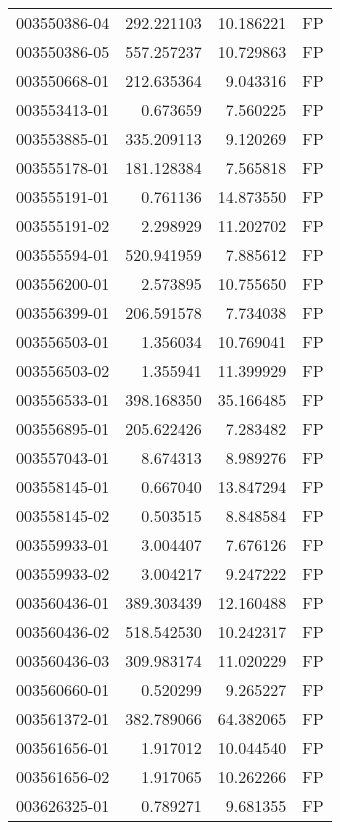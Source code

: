 \begin{tabular}{lrrl}
003550386-04 &  292.221103 &      10.186221 &   FP \\
003550386-05 &  557.257237 &      10.729863 &   FP \\
003550668-01 &  212.635364 &       9.043316 &   FP \\
003553413-01 &    0.673659 &       7.560225 &   FP \\
003553885-01 &  335.209113 &       9.120269 &   FP \\
003555178-01 &  181.128384 &       7.565818 &   FP \\
003555191-01 &    0.761136 &      14.873550 &   FP \\
003555191-02 &    2.298929 &      11.202702 &   FP \\
003555594-01 &  520.941959 &       7.885612 &   FP \\
003556200-01 &    2.573895 &      10.755650 &   FP \\
003556399-01 &  206.591578 &       7.734038 &   FP \\
003556503-01 &    1.356034 &      10.769041 &   FP \\
003556503-02 &    1.355941 &      11.399929 &   FP \\
003556533-01 &  398.168350 &      35.166485 &   FP \\
003556895-01 &  205.622426 &       7.283482 &   FP \\
003557043-01 &    8.674313 &       8.989276 &   FP \\
003558145-01 &    0.667040 &      13.847294 &   FP \\
003558145-02 &    0.503515 &       8.848584 &   FP \\
003559933-01 &    3.004407 &       7.676126 &   FP \\
003559933-02 &    3.004217 &       9.247222 &   FP \\
003560436-01 &  389.303439 &      12.160488 &   FP \\
003560436-02 &  518.542530 &      10.242317 &   FP \\
003560436-03 &  309.983174 &      11.020229 &   FP \\
003560660-01 &    0.520299 &       9.265227 &   FP \\
003561372-01 &  382.789066 &      64.382065 &   FP \\
003561656-01 &    1.917012 &      10.044540 &   FP \\
003561656-02 &    1.917065 &      10.262266 &   FP \\
003626325-01 &    0.789271 &       9.681355 &   FP \\

\end{tabular}
